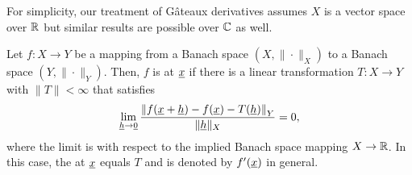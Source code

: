 \begin{remark}
For simplicity, our treatment of G\^{a}teaux derivatives assumes $X$ is a vector space over $\mathbb{R}$ but similar results are possible over $\mathbb{C}$ as well.
\end{remark}

\begin{definition}
Let $f \colon X \rightarrow Y$ be a mapping from a Banach space $(X,\|\cdot\|_X)$ to a Banach space $(Y,\|\cdot\|_Y)$.
Then, $f$ is  at $\underline{x}$ if there is a linear transformation $T\colon X \to Y$ with $\| T \| < \infty$ that satisfies 
\begin{equation} \label{eq:frechet_def}
\lim_{\underline{h} \to \underline{0}} \frac{\left\|f(\underline{x}+ \underline{h}) - f(\underline{x}) - T(\underline{h}) \right\|_Y}{\| \underline{h} \|_X} = 0,
\end{equation}
where the limit is with respect to the implied Banach space mapping $X\to \mathbb{R}$.
In this case, the  at $\underline{x}$ equals $T$ and is denoted by $f'(\underline{x})$ in general.
\end{definition}


